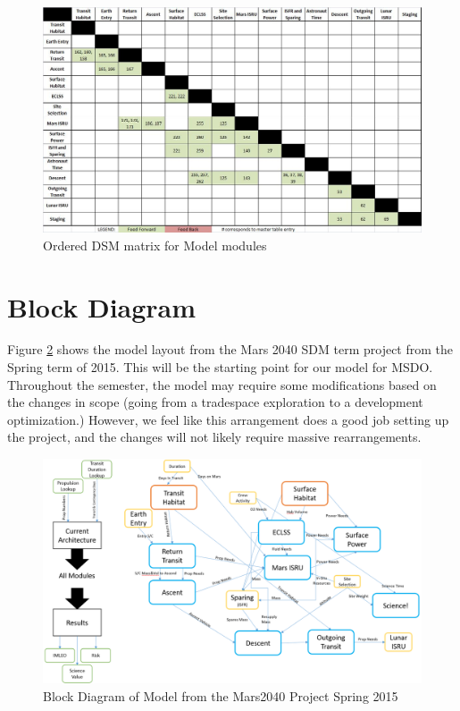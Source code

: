 \documentclass[11pt]{article} %
\begin{document}
\begin{figure}
\includegraphics[width=\textwidth]{OrderedDSM}
\caption{Ordered DSM matrix for Model modules}
\label{fig:ordered}
\end{figure}

\section{Block Diagram}
Figure \ref{fig:m2040block} shows the model layout from the Mars 2040 SDM term project from the Spring term of 2015.  This will be the starting point for our model for MSDO.  Throughout the semester, the model may require some modifications based on the changes in scope (going from a tradespace exploration to a development optimization.) However, we feel like this arrangement does a good job setting up the project, and the changes will not likely require massive rearrangements.
\begin{figure}
\includegraphics[width=\textwidth]{M2040Block}
\caption{Block Diagram of Model from the Mars2040 Project Spring 2015}
\label{fig:m2040block}
\end{figure}
\end{document}
